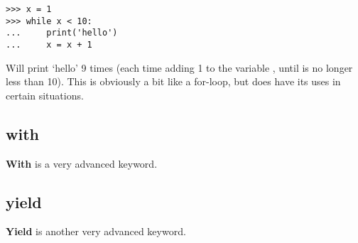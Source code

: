 \begin{Verbatim}[frame=single]
>>> x = 1
>>> while x < 10:
...     print('hello')
...     x = x + 1
\end{Verbatim}

Will print `hello' 9 times (each time adding 1 to the variable , until  is no longer less than 10). This is obviously a bit like a for-loop, but does have its uses in certain situations.

\subsection*{with}

\textbf{With} is a very advanced keyword.

\subsection*{yield}
\textbf{Yield} is another very advanced keyword.

\newpage
